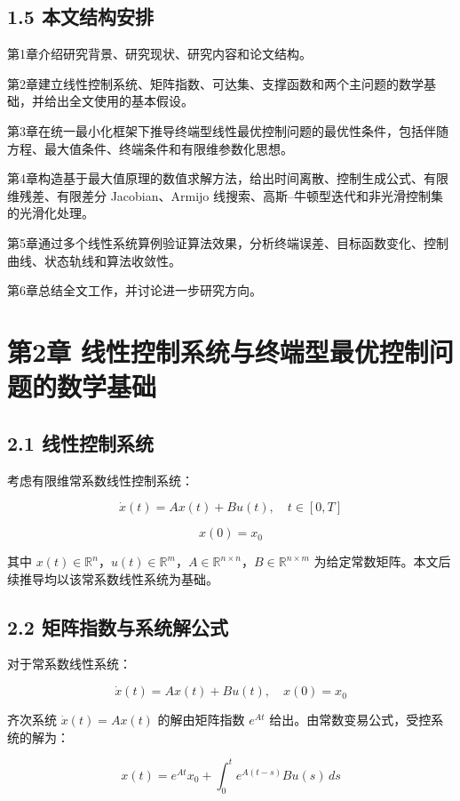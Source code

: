 \documentclass[UTF8,a4paper,zihao=-4]{ctexart}
\begin{document}
\subsection{1.5 本文结构安排}

第1章介绍研究背景、研究现状、研究内容和论文结构。

第2章建立线性控制系统、矩阵指数、可达集、支撑函数和两个主问题的数学基础，并给出全文使用的基本假设。

第3章在统一最小化框架下推导终端型线性最优控制问题的最优性条件，包括伴随方程、最大值条件、终端条件和有限维参数化思想。

第4章构造基于最大值原理的数值求解方法，给出时间离散、控制生成公式、有限维残差、有限差分 Jacobian、Armijo 线搜索、高斯--牛顿型迭代和非光滑控制集的光滑化处理。

第5章通过多个线性系统算例验证算法效果，分析终端误差、目标函数变化、控制曲线、状态轨线和算法收敛性。

第6章总结全文工作，并讨论进一步研究方向。

\section{第2章 线性控制系统与终端型最优控制问题的数学基础}

\subsection{2.1 线性控制系统}

考虑有限维常系数线性控制系统\cite[第15--31页]{kiselev2007}\cite[第76--91页]{lee1972}：

\[
\dot{x}(t)=Ax(t)+Bu(t),\quad t\in[0,T]
\]

\[
x(0)=x_0
\]

其中 $x(t)\in\mathbb{R}^n$，$u(t)\in\mathbb{R}^m$，$A\in\mathbb{R}^{n\times n}$，$B\in\mathbb{R}^{n\times m}$ 为给定常数矩阵。本文后续推导均以该常系数线性系统为基础。

\subsection{2.2 矩阵指数与系统解公式}

对于常系数线性系统：

\[
\dot{x}(t)=Ax(t)+Bu(t),\quad x(0)=x_0
\]

齐次系统 $\dot{x}(t)=Ax(t)$ 的解由矩阵指数 $e^{At}$ 给出\cite[第15--31页]{kiselev2007}\cite[第76--91页]{lee1972}。由常数变易公式，受控系统的解为：

\[
x(t)=e^{At}x_0+\int_0^t e^{A(t-s)}Bu(s)\,ds
\]
\end{document}
